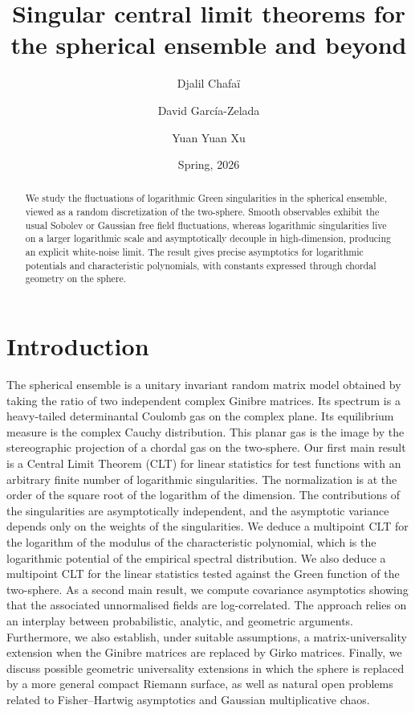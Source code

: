 \documentclass[10pt,reqno]{amsart}
\title{Singular central limit theorems for the spherical ensemble and beyond}
\date{Spring, 2026}
\author{Djalil Chafaï}
\author{David García-Zelada}
\author{Yuan Yuan Xu}
\numberwithin{equation}{section}
\numberwithin{figure}{section}
\theoremstyle{plain}
\newcommand{\<}{\langle}
\renewcommand{\>}{\rangle}
\begin{document}
\begin{abstract}
We study the fluctuations of logarithmic Green singularities in the spherical ensemble, viewed as a random discretization of the two-sphere. Smooth observables exhibit the usual Sobolev or Gaussian free field fluctuations, whereas logarithmic singularities live on a larger logarithmic scale and asymptotically decouple in high-dimension, producing an explicit white-noise limit. The result gives precise asymptotics for logarithmic potentials and characteristic polynomials, with constants expressed through chordal geometry on the sphere.
\end{abstract}

\maketitle

{\footnotesize\tableofcontents}

%

\section{Introduction}

 The spherical ensemble is a unitary invariant random matrix model obtained
 by taking the ratio of two independent complex Ginibre matrices. Its
 spectrum is a heavy-tailed determinantal Coulomb gas on the complex plane.
 Its equilibrium measure is the complex Cauchy distribution. This planar gas
 is the image by the stereographic projection of a chordal gas on the
 two-sphere. Our first main result is a Central Limit Theorem (CLT) for linear
 statistics for test functions with an arbitrary finite number of
 logarithmic singularities. The normalization is at the order of the square root of the 
 logarithm of the dimension.  The contributions of the singularities are asymptotically 
 independent, and the asymptotic variance depends only on the
 weights of the singularities. We deduce a multipoint CLT for the logarithm
 of the modulus of the characteristic polynomial, which is the logarithmic
 potential of the empirical spectral distribution. We also deduce a
 multipoint CLT for the linear statistics tested against the Green function of the
 two-sphere. As a second main result, we compute covariance asymptotics showing that the 
 associated unnormalised fields are log-correlated. The approach relies on an interplay
 between probabilistic, analytic, and geometric arguments. Furthermore, 
 we also establish, under suitable assumptions, a matrix-universality extension
 when the Ginibre matrices are replaced by Girko
 matrices. Finally, we discuss possible geometric universality extensions in which the
 sphere is replaced by a more general compact Riemann surface, as well as
 natural open problems related to Fisher--Hartwig asymptotics and Gaussian
 multiplicative chaos.
\end{document}
